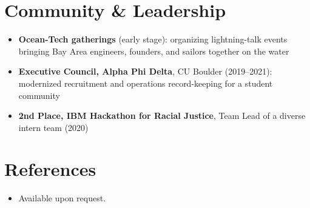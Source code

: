 \documentclass[11pt,a4paper,sans]{moderncv}
\begin{document}

\section{Community \& Leadership}
\vspace{1pt}
\begin{itemize}
\item \textbf{Ocean-Tech gatherings} (early stage): organizing lightning-talk events bringing Bay Area engineers, founders, and sailors together on the water
\item \textbf{Executive Council, Alpha Phi Delta}, CU Boulder (2019--2021): modernized recruitment and operations record-keeping for a student community
\item \textbf{2nd Place, IBM Hackathon for Racial Justice}, Team Lead of a diverse intern team (2020)
\end{itemize}


\section{References}
\vspace{1pt}
\begin{itemize}
\item{Available upon request.}
\end{itemize}
\end{document}
